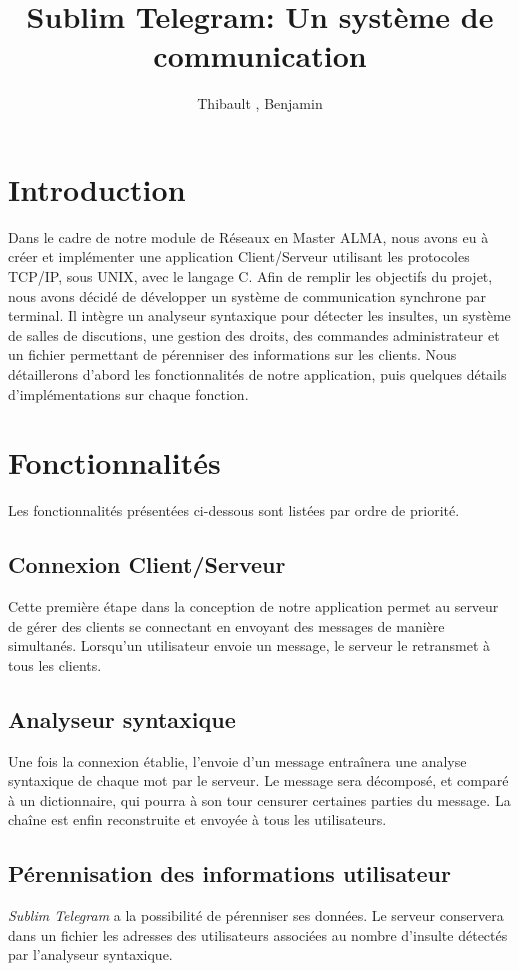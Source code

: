 \documentclass[a4paper, 12pt]{article}
\author{Thibault \bsc{Béziers la Fosse}, Benjamin \bsc{Moreau}}
\title{Sublim Telegram: Un système de communication}
\begin{document}
\maketitle
\clearpage
\tableofcontents
\clearpage

\section{Introduction}
Dans le cadre de notre module de Réseaux en Master ALMA, nous avons eu à créer et implémenter une application Client/Serveur utilisant les protocoles TCP/IP, sous UNIX, avec le langage C. 
Afin de remplir les objectifs du projet, nous avons décidé de développer un système de communication synchrone par terminal. Il intègre un analyseur syntaxique pour détecter les insultes, un système de salles de discutions, une gestion des droits, des commandes administrateur et un fichier permettant de pérenniser des informations sur les clients. 
Nous détaillerons d'abord les fonctionnalités de notre application, puis quelques détails d'implémentations sur chaque fonction. 
\section{Fonctionnalités}
Les fonctionnalités présentées ci-dessous sont listées par ordre de priorité.
\subsection{Connexion Client/Serveur}
Cette première étape dans la conception de notre application permet au serveur de gérer des clients se connectant en envoyant des messages de manière simultanés. Lorsqu'un utilisateur envoie un message, le serveur le retransmet à tous les clients.
\subsection{Analyseur syntaxique}
Une fois la connexion établie, l'envoie d'un message entraînera une analyse syntaxique de chaque mot par le serveur. Le message sera décomposé, et comparé à un dictionnaire, qui pourra à son tour censurer certaines parties du message. La chaîne est enfin reconstruite et envoyée à tous les utilisateurs.  
\subsection{Pérennisation des informations utilisateur}
\emph{Sublim Telegram} a la possibilité de pérenniser ses données. Le serveur conservera dans un fichier les adresses des utilisateurs associées au nombre d'insulte détectés par l'analyseur syntaxique.
\end{document}
